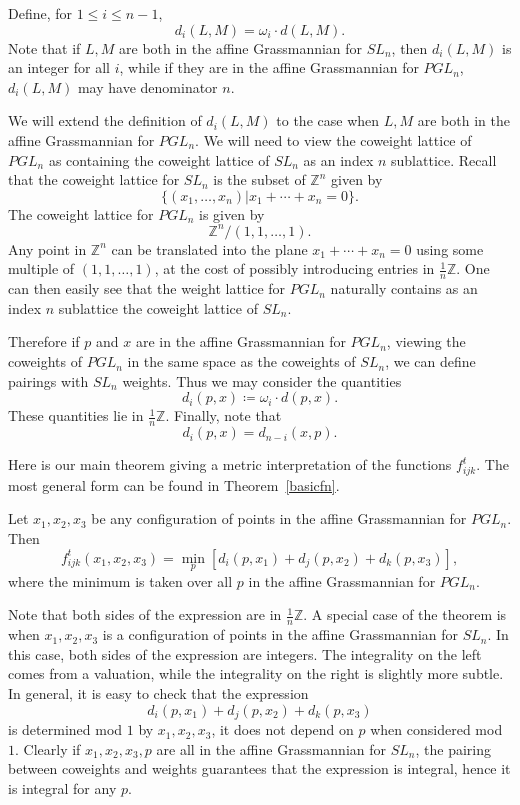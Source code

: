 \documentclass[ALCO,ThmDefs,Unicode,epreuves]{cedram}
\newcommand{\Z}{\mathbb{Z}}
\begin{document}
Define, for $1 \leq i \leq n-1$,
\[
d_i(L,M) = \omega_i \cdot d(L,M).
\]
Note that if $L, M$ are both in the affine Grassmannian for $SL_n$, then $d_i(L,M)$ is an integer for all $i$, while if they are in the affine Grassmannian for $PGL_n$, $d_i(L,M)$ may have denominator $n$.

We will extend the definition of $d_i(L,M)$ to the case when $L, M$ are both in the affine Grassmannian for $PGL_n$. We will need to view the coweight lattice of $PGL_n$ as containing the coweight lattice of $SL_n$ as an index $n$ sublattice. Recall that the coweight lattice for $SL_n$ is the subset of $\Z^n$ given by 
\[
\{(x_1, \dots, x_n) | x_1 + \cdots + x_n=0\}.
\]
The coweight lattice for $PGL_n$ is given by
\[
\Z^n/(1, 1, \dots, 1).
\]
Any point in $\Z^n$ can be translated into the plane $x_1 + \cdots + x_n=0$ using some multiple of $(1, 1, \dots, 1)$, at the cost of possibly introducing entries in $\frac{1}{n} \Z.$ One can then easily see that the weight lattice for $PGL_n$ naturally contains as an index $n$ sublattice the coweight lattice of $SL_n$.

Therefore if $p$ and $x$ are in the affine Grassmannian for $PGL_n$, viewing the coweights of $PGL_n$ in the same space as the coweights of $SL_n$, we can define pairings with $SL_n$ weights. Thus we may consider the quantities 
\[
d_i(p,x) \coloneqq  \omega_i \cdot d(p,x).
\]
These quantities lie in $\frac{1}{n} \Z$. Finally, note that
\[
d_i(p,x) = d_{n-i}(x,p).
\]


Here is our main theorem giving a metric interpretation of the functions $f_{ijk}^t.$ The most general form can be found in Theorem~\ref{basicfn}.

\begin{theorem}\label{geometric} Let $x_1, x_2, x_3$ be any configuration of points in the affine Grassmannian for $PGL_n$. Then 
\begin{equation}\label{geoeqn}
f_{ijk}^t (x_1,x_2,x_3) = \min_{p} [d_i(p,x_1) + d_j(p,x_2) + d_k(p,x_3)],
\end{equation}
where the minimum is taken over all $p$ in the affine Grassmannian for $PGL_n$.
\end{theorem}

\begin{rema} Note that both sides of the expression are in $\frac{1}{n} \Z$. A special case of the theorem is when $x_1, x_2, x_3$ is a configuration of points in the affine Grassmannian for $SL_n$. In this case, both sides of the expression are integers. The integrality on the left comes from a valuation, while the integrality on the right is slightly more subtle. In general, it is easy to check that the expression 
\[
d_i(p,x_1) + d_j(p,x_2) + d_k(p,x_3)
\]
is determined mod $1$ by $x_1, x_2, x_3$, \ie it does not depend on $p$ when considered mod $1$. Clearly if $x_1, x_2, x_3, p$ are all in the affine Grassmannian for $SL_n$, the pairing between coweights and weights guarantees that the expression is integral, hence it is integral for any $p$.
\end{rema}
\end{document}
